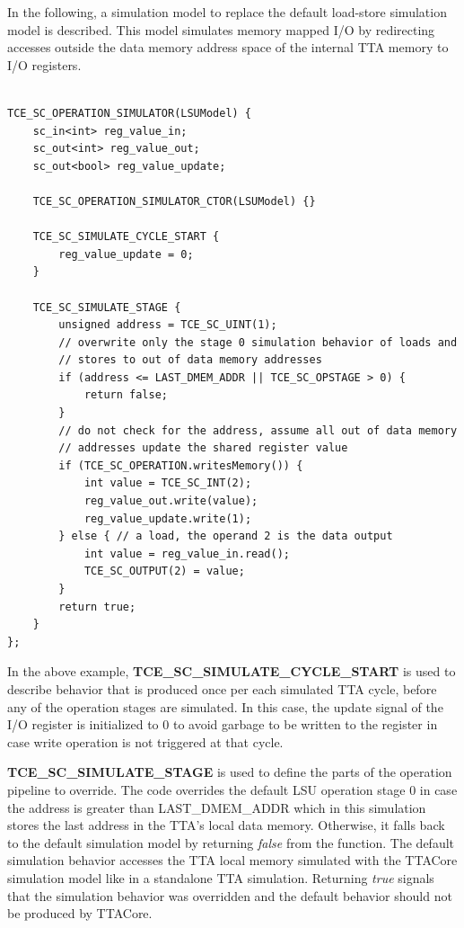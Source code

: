 \documentclass[twoside]{tceusermanual}
\begin{document}
In the following, a simulation model to replace the default load-store
simulation model is described. This model simulates memory mapped I/O
by redirecting accesses outside the data memory address space of the
internal TTA memory to I/O registers.

\begin{verbatim}

TCE_SC_OPERATION_SIMULATOR(LSUModel) {
    sc_in<int> reg_value_in;
    sc_out<int> reg_value_out;
    sc_out<bool> reg_value_update;

    TCE_SC_OPERATION_SIMULATOR_CTOR(LSUModel) {}

    TCE_SC_SIMULATE_CYCLE_START {
        reg_value_update = 0;
    }

    TCE_SC_SIMULATE_STAGE {
        unsigned address = TCE_SC_UINT(1);
        // overwrite only the stage 0 simulation behavior of loads and 
        // stores to out of data memory addresses
        if (address <= LAST_DMEM_ADDR || TCE_SC_OPSTAGE > 0) {
            return false; 
        }
        // do not check for the address, assume all out of data memory
        // addresses update the shared register value
        if (TCE_SC_OPERATION.writesMemory()) {
            int value = TCE_SC_INT(2);
            reg_value_out.write(value);
            reg_value_update.write(1);
        } else { // a load, the operand 2 is the data output 
            int value = reg_value_in.read();
            TCE_SC_OUTPUT(2) = value;
        }
        return true;
    }
};

\end{verbatim}

In the above example, \textbf{TCE\_SC\_SIMULATE\_CYCLE\_START} is used to
describe behavior that is produced once per each simulated TTA cycle,
before any of the operation stages are simulated. In this case,
the update signal of the I/O register is initialized to 0 to avoid
garbage to be written to the register in case write operation is not
triggered at that cycle. 

\textbf{TCE\_SC\_SIMULATE\_STAGE} is used to define the parts of the operation 
pipeline to override. The code overrides the default LSU operation stage
0 in case the address is greater than LAST\_DMEM\_ADDR which in this simulation
stores the last address in the TTA's local data memory. Otherwise, it falls 
back to the default simulation model by returning \textit{false} from the 
function. The default simulation behavior accesses the TTA local memory 
simulated with the TTACore simulation model like in a standalone TTA 
simulation. Returning \textit{true} signals that the simulation behavior was 
overridden and the default behavior should not be produced by TTACore.
\end{document}

